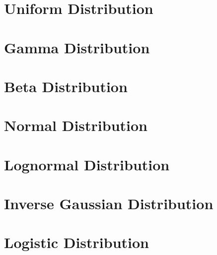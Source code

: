 \section{Uniform Distribution}

\section{Gamma Distribution}

\section{Beta Distribution}

\section{Normal Distribution}

\section{Lognormal Distribution}

\section{Inverse Gaussian Distribution}

\section{Logistic Distribution}

